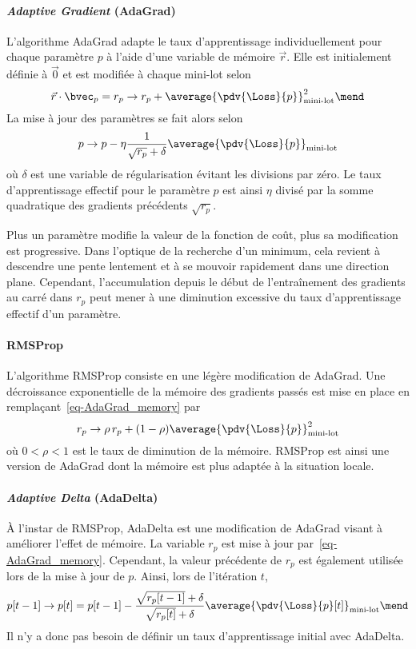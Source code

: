 \paragraph{\emph{Adaptive Gradient} (AdaGrad)} \cite{adagrad}
L'algorithme AdaGrad adapte le taux d'apprentissage individuellement pour chaque paramètre $p$
à l'aide d'une
variable de mémoire $\vec{r}$.
Elle est initialement définie à $\vec{0}$ et est modifiée à chaque mini-lot selon
\begin{equation}
\vec{r}\cdot\bvec_p = r_p \to r_p + \average{\pdv{\Loss}{p}}_\text{mini-lot}^2
\label{eq-AdaGrad_memory}
\mend
\end{equation}
La mise à jour des paramètres se fait alors selon
\begin{equation}
p \to p - \eta \frac{1}{\sqrt{r_p}+\delta} \average{\pdv{\Loss}{p}}_\text{mini-lot}
\end{equation}
où $\delta$ est une variable de régularisation évitant les divisions par zéro.
Le taux d'apprentissage effectif pour le paramètre $p$
est ainsi $\eta$ divisé par la somme quadratique des gradients précédents $\sqrt{r_p}$.
\par
Plus un paramètre modifie la valeur de la fonction de coût, plus sa modification est progressive.
Dans l'optique de la recherche d'un minimum, cela revient à descendre une pente lentement et à se mouvoir rapidement dans une direction plane.
Cependant, l'accumulation depuis le début de l'entraînement des gradients au carré dans $r_p$ peut mener à une diminution excessive du taux d'apprentissage effectif d'un paramètre.
\paragraph{RMSProp} \cite{RMSProp}
L'algorithme RMSProp consiste en une légère modification de AdaGrad.
Une décroissance exponentielle de la mémoire des gradients passés est mise en place en remplaçant~\eqref{eq-AdaGrad_memory} par
\begin{equation}
r_p \to \rho \, r_p + (1-\rho)\average{\pdv{\Loss}{p}}_\text{mini-lot}^2
\end{equation}
où $0<\rho<1$ est le taux de diminution de la mémoire.
RMSProp est ainsi une version de AdaGrad dont la mémoire est plus adaptée à la situation locale.
\paragraph{\emph{Adaptive Delta} (AdaDelta)}
À l'instar de RMSProp, AdaDelta est une modification de AdaGrad visant à améliorer l'effet de mémoire.
La variable $r_p$ est mise à jour par~\eqref{eq-AdaGrad_memory}.
Cependant, la valeur précédente de $r_p$ est également utilisée lors de la mise à jour de $p$.
Ainsi, lors de l'itération $t$,
\begin{equation}
p [t-1] \to p [t] = p[t-1] - \frac{\sqrt{r_p[t-1]}+\delta}{\sqrt{r_p[t]}+\delta} \average{\pdv{\Loss}{p} [t]}_\text{mini-lot}
\mend
\end{equation}
Il n'y a donc pas besoin de définir un taux d'apprentissage initial avec AdaDelta.
